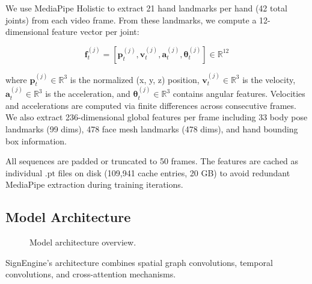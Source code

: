 \documentclass[conference]{IEEEtran}
\begin{document}
We use MediaPipe Holistic to extract 21 hand landmarks per hand (42 total joints) from each video frame. From these landmarks, we compute a 12-dimensional feature vector per joint:

\begin{equation}
\mathbf{f}_t^{(j)} = [\mathbf{p}_t^{(j)}, \mathbf{v}_t^{(j)}, \mathbf{a}_t^{(j)}, \boldsymbol{\theta}_t^{(j)}] \in \mathbb{R}^{12}
\end{equation}

where $\mathbf{p}_t^{(j)} \in \mathbb{R}^3$ is the normalized (x, y, z) position, $\mathbf{v}_t^{(j)} \in \mathbb{R}^3$ is the velocity, $\mathbf{a}_t^{(j)} \in \mathbb{R}^3$ is the acceleration, and $\boldsymbol{\theta}_t^{(j)} \in \mathbb{R}^3$ contains angular features. Velocities and accelerations are computed via finite differences across consecutive frames. We also extract 236-dimensional global features per frame including 33 body pose landmarks (99 dims), 478 face mesh landmarks (478 dims), and hand bounding box information.

All sequences are padded or truncated to 50 frames. The features are cached as individual $\text{.pt}$ files on disk (109,941 cache entries, 20 GB) to avoid redundant MediaPipe extraction during training iterations.

\subsection{Model Architecture}

\begin{figure}[htbp]
\centering
{}
\caption{Model architecture overview.}
\label{fig:arch}
\end{figure}

SignEngine's architecture combines spatial graph convolutions, temporal convolutions, and cross-attention mechanisms.
\end{document}
